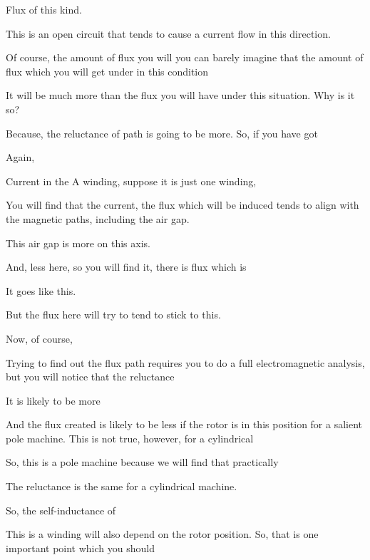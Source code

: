 \documentclass{article}
\begin{document}


Flux of this kind.

This is an open circuit that tends to cause a current flow in this direction.

Of course, the amount of flux you will you can barely imagine that the amount of flux which you will get under in this condition

It will be much more than the flux you will have under this situation. Why is it so?

Because, the reluctance of path is going to be more. So, if you have got



Again,

Current in the A winding, suppose it is just one winding,

You will find that the current, the flux which will be induced tends to align with the magnetic paths, including the air gap.

This air gap is more on this axis.

And, less here, so you will find it, there is flux which is



It goes like this.

But the flux here will try to tend to stick to this.

Now, of course,

Trying to find out the flux path requires you to do a full electromagnetic analysis, but you will notice that the reluctance

It is likely to be more

And the flux created is likely to be less if the rotor is in this position for a salient pole machine. This is not true, however, for a cylindrical

So, this is a pole machine because we will find that practically

The reluctance is the same for a cylindrical machine.

So, the self-inductance of

This is a winding will also depend on the rotor position. So, that is one important point which you should
\end{document}
